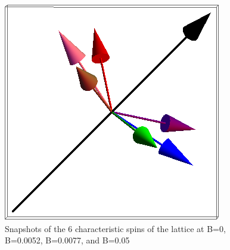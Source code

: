 \documentclass{article}
\begin{document}
\begin{figure}[ht]
\includegraphics[scale=0.27]{4S000to005G.png}
\caption{Snapshots of the 6 characteristic spins of the lattice at B=0, B=0.0052, B=0.0077, and B=0.05}
\end{figure}
\pagebreak
\end{document}
